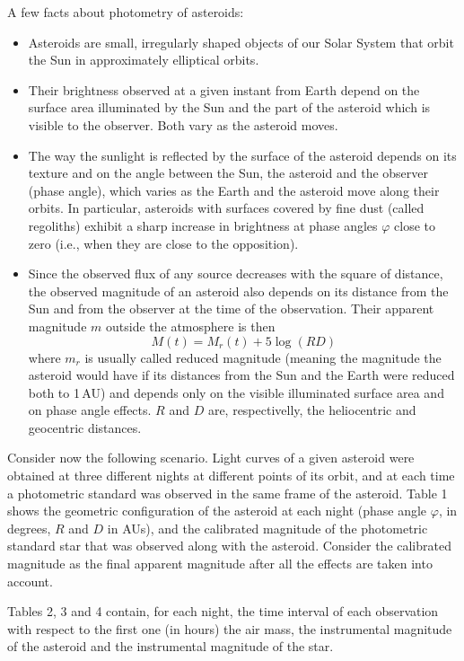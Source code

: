 A few facts about photometry of asteroids:
\begin{itemize}
\item Asteroids are small, irregularly shaped objects of our Solar System
  that orbit the Sun in approximately elliptical orbits.
\item Their brightness observed at a given instant from Earth depend on the
  surface area illuminated by the Sun and the part of the asteroid which is
  visible to the observer. Both vary as the asteroid moves.
\item The way the sunlight is reflected by the surface of the asteroid
  depends on its texture and on the angle between the Sun, the asteroid and
  the observer (phase angle), which varies as the Earth and the asteroid move
  along their orbits. In particular, asteroids with surfaces covered by fine
  dust (called regoliths) exhibit a sharp increase in brightness at phase
  angles $\varphi$ close to zero (i.e., when they are close to the
  opposition).
\item Since the observed flux of any source decreases with the square of
  distance, the observed magnitude of an asteroid also depends on its
  distance from the Sun and from the observer at the time of the observation.
  Their apparent magnitude $m$ outside the atmosphere is then
  \[ M(t) = M_r(t) + 5\log(RD) \]
  where $m_r$ is usually called reduced magnitude (meaning the magnitude the
  asteroid would have if its distances from the Sun and the Earth were
  reduced both to 1\,AU) and depends only on the visible illuminated surface
  area and on phase angle effects. $R$ and $D$ are, respectivelly, the
  heliocentric and geocentric distances.
\end{itemize}

Consider now the following scenario. Light curves of a given asteroid were
obtained at three different nights at different points of its orbit, and at
each time a photometric standard was observed in the same frame of the
asteroid. Table 1 shows the geometric configuration of the asteroid at each
night (phase angle $\varphi$, in degrees, $R$ and $D$ in AUs), and the
calibrated magnitude of the photometric standard star that was observed along
with the asteroid. Consider the calibrated magnitude as the final apparent
magnitude after all the effects are taken into account.

Tables 2, 3 and 4 contain, for each night, the time interval of each
observation with respect to the first one (in hours) the air mass, the
instrumental magnitude of the asteroid and the instrumental magnitude of the
star.

